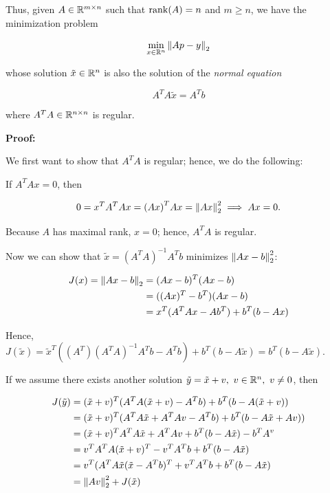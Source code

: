 Thus, given \(A \in \mathbb{R}^{m \times n}\) such that \(\mathrm{rank}(A) = n\) and \(m \ge n\), we have the minimization problem 

\[
        \min_{x \in \mathbb{R}^n} \left\| Ap - y \right\|_2
\]

whose solution \(\tilde{x} \in \mathbb{R}^n\) is also the solution of the \emph{normal equation}

\[
        A^T A \tilde{x} = A^T b 
\]

where \(A^T A \in \mathbb{R}^{n \times n}\) is regular.

\textbf{Proof:}

We first want to show that \(A^T A\) is regular; hence, we do the following: 

If \(A^T Ax = 0\), then 


\[
    0 = x^T A^T Ax = {(Ax)}^T Ax = \left\| Ax \right\|_2^2 \implies Ax = 0.
\]

Because \(A\) has maximal rank, \(x = 0\); hence, \(A^T A\) is regular.

Now we can show that \(\tilde{x} = (A^T A)^{-1}A^T b\) minimizes \(\left\| Ax - b \right\|_2^2\):

\begin{align*}
    J(x) = \left\| Ax - b \right\|_2 &= (Ax - b)^T(Ax - b) \\
     &= ((Ax)^T - b^T)(Ax - b) \\
     &= x^T(A^TAx - Ab^T) + b^T(b - Ax)
\end{align*}

Hence, \(J(\tilde{x}) = \tilde{x}^T((A^T)(A^TA)^{-1} A^Tb - A^Tb) + b^T(b - A\tilde{x}) = b^T(b - A\tilde{x})\).

If we assume there exists another solution \(\tilde{y} =  \tilde{x} + v, \ v \in \mathbb{R}^n, \ v\ne 0\), then 

\begin{align*}
    J(\tilde{y}) &= (\tilde{x} + v)^T(A^T A(\tilde{x} + v) - A^Tb) + b^T (b - A(\tilde{x} + v)) \\ 
     &= (\tilde{x} + v)^T(A^T A\tilde{x} + A^TAv - A^Tb) + b^T (b - A\tilde{x} + Av)) \\ 
     &= (\tilde{x} + v)^T A^T A\tilde{x} + A^TAv  + b^T (b - A\tilde{x}) - b^T A^ v \\ 
     &=  v^TA^T A(\tilde{x} + v)^T - v^TA^Tb  + b^T (b - A\tilde{x}) \\ 
     &=  v^T(A^T A\tilde{x}(\tilde{x}  - A^Tb)^T + v^TA^Tb  + b^T (b - A\tilde{x}) \\ 
     &= \left\| Av \right\|_2^2 + J(\tilde{x})
\end{align*}

